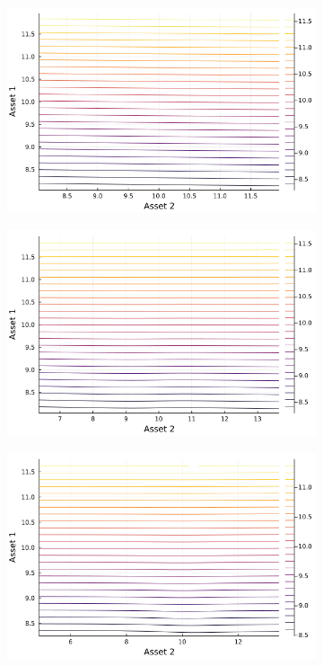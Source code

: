 \documentclass{article}
\begin{document}
\begin{figure}
    \centering
    \begin{subfigure}{0.4\textwidth}
        \includegraphics[width=\textwidth]{../plots/params/baseline/p1.png}
        \end{subfigure}
    \begin{subfigure}{0.4\textwidth}
        \includegraphics[width=\textwidth]{../plots/params/a2-mean-shift/p1.png}
    \end{subfigure}
    \begin{subfigure}{0.4\textwidth}
        \includegraphics[width=\textwidth]{../plots/params/a2-meanvar-shift/p1.png}

\end{subfigure}
\end{figure}
\end{document}
